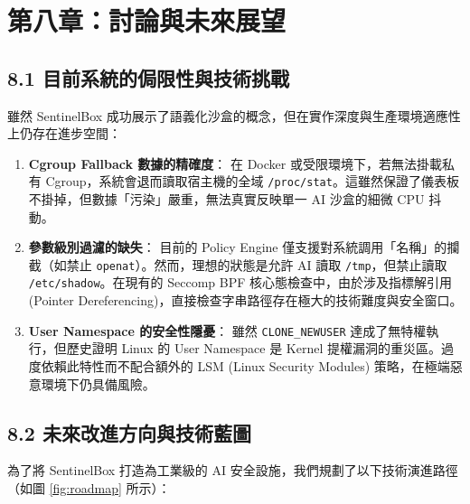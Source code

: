 \documentclass[12pt, a4paper, twoside]{article}
\begin{document}
\newpage
\section{第八章：討論與未來展望}

\subsection{8.1 目前系統的侷限性與技術挑戰}
雖然 SentinelBox 成功展示了語義化沙盒的概念，但在實作深度與生產環境適應性上仍存在進步空間：

\begin{enumerate}
    \item \textbf{Cgroup Fallback 數據的精確度}：
    在 Docker 或受限環境下，若無法掛載私有 Cgroup，系統會退而讀取宿主機的全域 \texttt{/proc/stat}。這雖然保證了儀表板不掛掉，但數據「污染」嚴重，無法真實反映單一 AI 沙盒的細微 CPU 抖動。

    \item \textbf{參數級別過濾的缺失}：
    目前的 Policy Engine 僅支援對系統調用「名稱」的攔截（如禁止 \texttt{openat}）。然而，理想的狀態是允許 AI 讀取 \texttt{/tmp}，但禁止讀取 \texttt{/etc/shadow}。在現有的 Seccomp BPF 核心態檢查中，由於涉及指標解引用 (Pointer Dereferencing)，直接檢查字串路徑存在極大的技術難度與安全窗口。

    \item \textbf{User Namespace 的安全性隱憂}：
    雖然 \texttt{CLONE\_NEWUSER} 達成了無特權執行，但歷史證明 Linux 的 User Namespace 是 Kernel 提權漏洞的重災區。過度依賴此特性而不配合額外的 LSM (Linux Security Modules) 策略，在極端惡意環境下仍具備風險。
\end{enumerate}

\subsection{8.2 未來改進方向與技術藍圖}
為了將 SentinelBox 打造為工業級的 AI 安全設施，我們規劃了以下技術演進路徑（如圖 \ref{fig:roadmap} 所示）：
\end{document}
